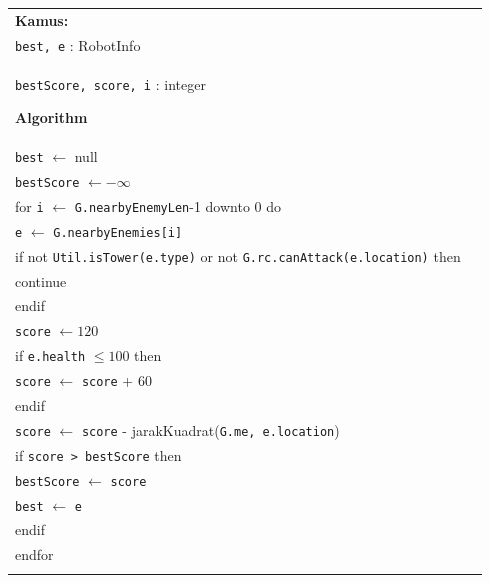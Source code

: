 \documentclass{article}
\newenvironment{pseudobox}
{
\centering
\begin{longtable}{|p{0.94\linewidth}|}
\hline
}
{
\\ \hline
\end{longtable}
\vspace{0.05cm}
}
\begin{document}
\begin{enumerate}[label=\alph*.]
\begin{enumerate}[label=\alph*.]
\begin{pseudobox}
\textbf{Kamus:} \\
\hspace*{1.5em}\texttt{best, e} : RobotInfo \\
\hspace*{1.5em}\texttt{bestScore, score, i} : integer

\textbf{Algorithm} \\
\hspace*{1.5em}\texttt{best} $\leftarrow$ null \\
\hspace*{1.5em}\texttt{bestScore} $\leftarrow -\infty$ \\

\hspace*{1.5em}for \texttt{i} $\leftarrow$ \texttt{G.nearbyEnemyLen}-1 downto 0 do \\
\hspace*{3em}\texttt{e} $\leftarrow$ \texttt{G.nearbyEnemies[i]} \\

\hspace*{3em}if not \texttt{Util.isTower(e.type)} or not \texttt{G.rc.canAttack(e.location)} then \\
\hspace*{4.5em}continue \\
\hspace*{3em}endif \\

\hspace*{3em}\texttt{score} $\leftarrow 120$ \\
\hspace*{3em}if \texttt{e.health} $\leq 100$ then \\
\hspace*{4.5em}\texttt{score} $\leftarrow$ \texttt{score} + 60 \\
\hspace*{3em}endif \\
\hspace*{3em}\texttt{score} $\leftarrow$ \texttt{score} - jarakKuadrat(\texttt{G.me, e.location}) \\

\hspace*{3em}if \texttt{score > bestScore} then \\
\hspace*{4.5em}\texttt{bestScore} $\leftarrow$ \texttt{score} \\
\hspace*{4.5em}\texttt{best} $\leftarrow$ \texttt{e} \\
\hspace*{3em}endif \\
\hspace*{1.5em}endfor \\


\end{pseudobox}
\end{enumerate}
\end{enumerate}
\end{document}
